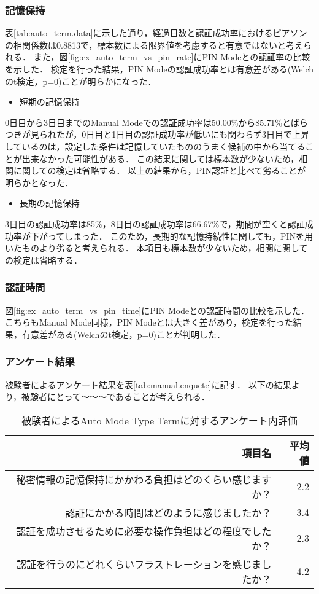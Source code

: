 \subsubsection{記憶保持}
表\ref{tab:auto_term.data}に示した通り，経過日数と認証成功率におけるピアソンの相関係数は0.8813で，標本数による限界値を考慮すると有意ではないと考えられる．
また，図\ref{fig:ex_auto_term_vs_pin_rate}にPIN Modeとの認証率の比較を示した．
検定を行った結果，PIN Modeの認証成功率とは有意差がある(Welchのt検定，p=0)ことが明らかになった．
\begin{itemize}
  \item 短期の記憶保持
\end{itemize}
0日目から3日目までのManual Modeでの認証成功率は50.00\%から85.71\%とばらつきが見られたが，0日目と1日目の認証成功率が低いにも関わらず3日目で上昇しているのは，設定した条件は記憶していたもののうまく候補の中から当てることが出来なかった可能性がある．
この結果に関しては標本数が少ないため，相関に関しての検定は省略する．
以上の結果から，PIN認証と比べて劣ることが明らかとなった．

\begin{itemize}
  \item 長期の記憶保持
\end{itemize}
3日目の認証成功率は85\%，8日目の認証成功率は66.67\%で，期間が空くと認証成功率が下がってしまった．
このため，長期的な記憶持続性に関しても，PINを用いたものより劣ると考えられる．
本項目も標本数が少ないため，相関に関しての検定は省略する．

\subsubsection{認証時間}
図\ref{fig:ex_auto_term_vs_pin_time}にPIN Modeとの認証時間の比較を示した．
こちらもManual Mode同様，PIN Modeとは大きく差があり，検定を行った結果，有意差がある(Welchのt検定，p=0)ことが判明した．

\subsubsection{アンケート結果}
被験者によるアンケート結果を表\ref{tab:manual.enquete}に記す．
以下の結果より，被験者にとって〜〜〜であることが考えられる．
\begin{table}[ht]
  \begin{center}
    \small
    \begin{tabular}{|r|r|} \hline
      項目名 & 平均値 \\ \hline
      秘密情報の記憶保持にかかわる負担はどのくらい感じますか？ & 2.2 \\
      認証にかかる時間はどのように感じましたか？ & 3.4 \\
      認証を成功させるために必要な操作負担はどの程度でしたか？ & 2.3 \\
      認証を行うのにどれくらいフラストレーションを感じましたか？ & 4.2 \\ \hline
    \end{tabular}
  \end{center}
  \caption{被験者によるAuto Mode Type Termに対するアンケート内評価}
  \label{tab:auto_term.enquete}
\end{table}


